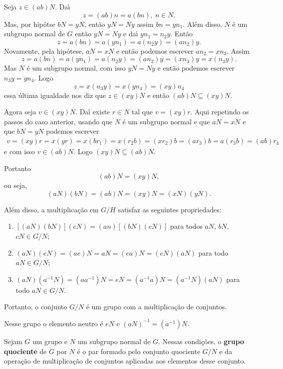 Seja $z \in (ab)N$. Da{\'\i}
\[
	z = (ab)n = a(bn),\ n \in N.
\]
Mas, por hip\'otse $bN = yN$, ent\~ao $yN = Ny$ assim $bn = yn_1$. Al\'em disso, $N$ \'e um subgrupo normal de $G$ ent\~ao $yN = Ny$ e da{\'\i} $yn_1 = n_2y$. Ent\~ao
\[
	z = a(bn) = a(yn_1) = a(n_2y) = (an_2)y.
\]
Novamente, pela hip\'otese, $aN = xN$ e ent\~ao podemos escrever $an_2 = xn_3$. Assim
\[
	z = a(bn) = a(yn_1) = a(n_2y) = (an_2)y = (xn_3)y = x(n_3y).
\]
Mas $N$ \'e um subgrupo normal, com isso $yN = Ny$ e ent\~ao podemos escrever $n_3y = yn_4$. Logo
\[
	z = x(n_3y) = x(yn_4) = (xy)n_4
\]
essa \'ultima igualdade nos diz que $z \in (xy)N$ e ent\~ao $(ab)N \subseteq (xy)N$.

Agora seja $v \in (xy)N$. Da{\'\i} existe $r \in N$ tal que $v = (xy)r$. Aqui repetindo os passos do caso anterior, usando que $N$ \'e um subgrupo normal e que $aN = xN$ e que $bN = yN$ podemos escrever
\begin{align*}
	v = (xy)r = x(yr) = x(br_1) = x(r_2b) = (xr_2)b = (ar_3)b = a(r_3b) = (ab)r_4
\end{align*}
e com isso $v \in (ab)N$. Logo $(xy)N \subseteq (ab)N$.

Portanto
\[
	(ab)N = (xy)N,
\]
ou seja,
\[
	(aN)(bN) = (ab)N = (xy)N = (xN)(yN).
\]

Al\'em disso, a multiplica\c{c}\~ao em $G/H$ satisfaz as seguintes propriedades:

\begin{enumerate}[label={\roman*})]
    \item $[(aN)(bN)](cN) = (an)[(bN)(cN)]$ para todos $aN$, $bN$, $cN \in G/N$;

    \item $(aN)(eN) = (ae)N = aN = (ea)N = (eN)(aN)$ para todo $aN \in G/N$;

    \item $(aN)(a^{-1}N) = (aa^{-1})N = eN = (a^{-1}a)N = (a^{-1}N)(aN)$ para todo $aN \in G/N$.
\end{enumerate}

Portanto, o conjunto $G/N$ \'e um grupo com a multiplica\c{c}\~ao de conjuntos.

Nesse grupo o elemento neutro \'e $eN$ e $(aN)^{-1} = (a^{-1})N$.

\begin{definicao}
    Sejam $G$ um grupo e $N$ um subgrupo normal de $G$. Nessas condi\c{c}\~oes, o \textbf{grupo quociente} 
    de $G$ por $N$ \'e o par formado pelo conjunto quociente $G/N$ e da opera\c{c}\~ao de multiplica\c{c}\~ao de conjuntos 
    aplicadas aos elementos desse conjunto.
\end{definicao}

